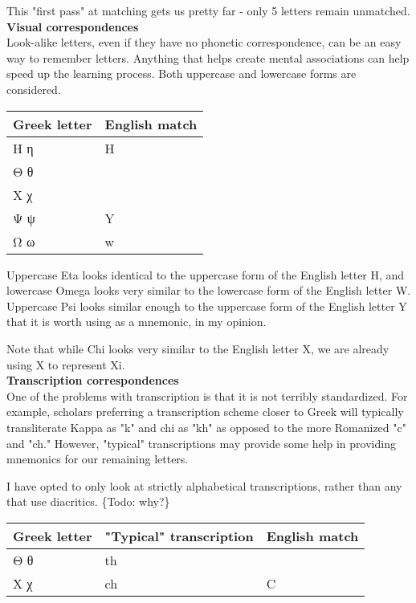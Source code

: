 \documentclass[11pt]{article}
\begin{document}
This "first pass" at matching gets us pretty far - only 5 letters remain unmatched. \\

\noindent \textbf{Visual correspondences} \\

Look-alike letters, even if they have no phonetic correspondence, can be an easy way to remember letters. Anything that helps create mental associations can help speed up the learning process. Both uppercase and lowercase forms are considered.

\begin{center}
\begin{tabular}{ll}
Greek letter & English match\\
\hline
Η η & H\\
Θ θ & \\
Χ χ & \\
Ψ ψ & Y\\
Ω ω & w\\
\end{tabular}
\end{center}

Uppercase Eta looks identical to the uppercase form of the English letter H, and lowercase Omega looks very similar to the lowercase form of the English letter W. Uppercase Psi looks similar enough to the uppercase form of the English letter Y that it is worth using as a mnemonic, in my opinion.

Note that while Chi looks very similar to the English letter X, we are already using X to represent Xi. \\

\noindent \textbf{Transcription correspondences} \\

One of the problems with transcription is that it is not terribly standardized. For example, scholars preferring a transcription scheme closer to Greek will typically transliterate Kappa as "k" and chi as "kh" as opposed to the more Romanized "c" and "ch." However, "typical" transcriptions may provide some help in providing mnemonics for our remaining letters.

I have opted to only look at strictly alphabetical transcriptions, rather than any that use diacritics. \{Todo: why?\}

\begin{center}
\begin{tabular}{lll}
Greek letter & "Typical" transcription & English match\\
\hline
Θ θ & th & \\
Χ χ & ch & C\\
\end{tabular}
\end{center}
\end{document}

